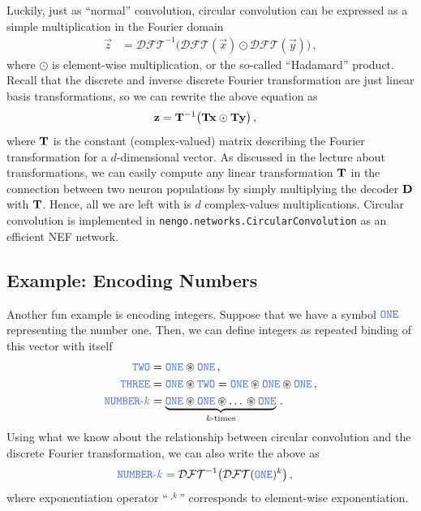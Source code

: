 \documentclass[10pt,letterpaper,oneside]{article}
\begin{document}
Luckily, just as \enquote{normal} convolution, circular convolution can be expressed as a simple multiplication in the Fourier domain
\begin{align*}
	\vec z &= \mathcal{DFT}^{-1} \big( \mathcal{DFT}(\vec x) \odot \mathcal{DFT}(\vec y) \big) \,,
\end{align*}
where $\odot$ is element-wise multiplication, or the so-called \enquote{Hadamard} product. Recall that the discrete and inverse discrete Fourier transformation are just linear basis transformations, so we can rewrite the above equation as
\begin{align*}
	{\mathbf{z}} &= {\mathbf{T}}^{-1} \big( {\mathbf{T}} {\mathbf{x}} \odot {\mathbf{T}} {\mathbf{y}} \big) \,,
\end{align*}
where ${\mathbf{T}}$ is the constant (complex-valued) matrix describing the Fourier transformation for a $d$-dimensional vector. As discussed in the lecture about transformations, we can easily compute any linear transformation ${\mathbf{T}}$ in the connection between two neuron populations by simply multiplying the decoder ${\mathbf{D}}$ with ${\mathbf{T}}$. Hence, all we are left with is $d$ complex-values multiplications. Circular convolution is implemented in \texttt{nengo.networks.CircularConvolution} as an efficient NEF network.

\subsection{Example: Encoding Numbers}

Another fun example is encoding integers. Suppose that we have a symbol $\Obj{ONE}$ representing the number one. Then, we can define integers as repeated binding of this vector with itself
\begin{align*}
	\Obj{TWO} &= \Obj{ONE} \CC \Obj{ONE} \,, \\
	\Obj{THREE} &= \Obj{ONE} \CC \Obj{TWO} = \Obj{ONE} \CC \Obj{ONE} \CC \Obj{ONE} \,, \\
	\Obj{NUMBER\text{-$k$}} &= \underbrace{\Obj{ONE} \CC \Obj{ONE} \CC \text{\textellipsis} \CC \Obj{ONE}}_{\text{$k$-times}} \,.
\end{align*}
Using what we know about the relationship between circular convolution and the discrete Fourier transformation, we can also write the above as
\begin{align*}
	\Obj{NUMBER\text{-$k$}} &= \mathcal{DFT}^{-1} \big( \mathcal{DFT}(\Obj{ONE})^k \big) \,,
\end{align*}
where exponentiation operator \enquote{$\cdot^k$} corresponds to element-wise exponentiation.
\end{document}

